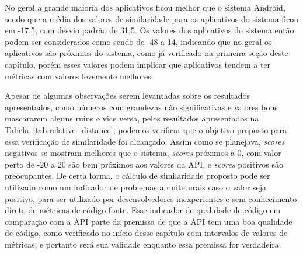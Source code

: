 No geral a grande maioria dos aplicativos ficou melhor que o sistema Android, sendo que a média dos valores de similaridade para os aplicativos do sistema ficou em -17,5, com desvio padrão de 31,5. Os valores dos aplicativos do sistema então podem ser considerados como sendo de -48 a 14, indicando que no geral os aplicativos são próximos do sistema, como já verificado na primeira seção deste capítulo, porém esses valores podem implicar que aplicativos tendem a ter métricas com valores levemente melhores.

Apesar de algumas observações serem levantadas sobre os resultados apresentados, como números com grandezas não significativas e valores bons mascararem alguns ruins e vice versa, pelos resultados apresentados na Tabela~\ref{tab:relative_distance}, podemos verificar que o objetivo proposto para essa verificação de similaridade foi alcançado. Assim como se planejava, \textit{scores} negativos se mostram melhores que o sistema, \textit{scores} próximos a 0, com valor perto de -20 a 20 são bem próximos aos valores da API, e \textit{scores} positivos são preocupantes. De certa forma, o cálculo de similaridade proposto pode ser utilizado como um indicador de problemas arquiteturais caso o valor seja positivo, para ser utilizado por desenvolvedores inexperientes e sem conhecimento direto de métricas de código fonte. Esse indicador de qualidade de código em comparação com a API parte da premissa de que a API tem uma boa qualidade de código, como verificado no início desse capítulo com intervalos de valores de métricas, e portanto será sua validade enquanto essa premissa for verdadeira.